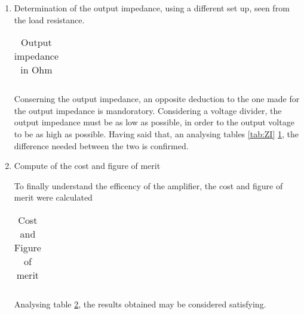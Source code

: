 \begin{enumerate}
\par The result obtained for the input impedance, considering the value in Ohm, is high. This is benefitial for the gain, because the voltage in the node In 2 must be as similiar to Vin as possible. Using a voltage divider, the only way to achieve this was to have a very high resistance value.

\item Determination of the output impedance, using a different set up, seen from the load resistance. 

\begin{table}[h]
  \centering
  \begin{tabular}{|l|r|}
    \hline    
   
   \end{tabular}
  \caption{Output impedance in Ohm}
  
  \label{tab:ZO}
\end{table}


Conserning the output impedance, an opposite deduction to the one made for the output impedance is mandoratory. Considering a voltage divider, the output impedance must be as low as possible, in order to the output voltage to be as high as possible. Having said that, an analysing tables \ref{tab:ZI} \ref{tab:ZO}, the difference needed between the two is confirmed. 

\item Compute of the cost and figure of merit
\par To finally understand the efficency of the amplifier, the cost and figure of merit were calculated

\begin{table}[ht]
  \centering
  \begin{tabular}{|l|r|}
    \hline    
   
   \end{tabular}
  \caption{Cost and Figure of merit}
  \label{tab:cost}
\end{table}

Analysing table \ref{tab:cost}, the results obtained may be considered satisfying.


\end{enumerate}



